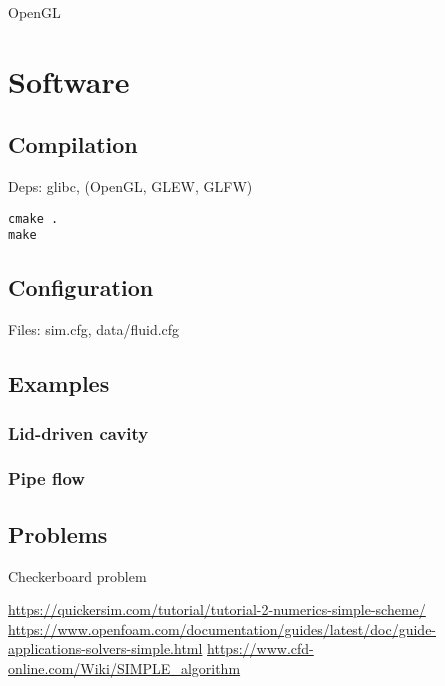 \documentclass[12pt]{article}
\begin{document}
OpenGL

\section{Software}

\subsection{Compilation}

Deps: glibc, (OpenGL, GLEW, GLFW)

\begin{verbatim}
cmake .
make
\end{verbatim}

\subsection{Configuration}

Files: sim.cfg, data/fluid.cfg

\subsection{Examples}

\subsubsection{Lid-driven cavity}

\subsubsection{Pipe flow}

\subsection{Problems}

Checkerboard problem

\begin{thebibliography}{9}

 \url{https://quickersim.com/tutorial/tutorial-2-numerics-simple-scheme/}
 \url{https://www.openfoam.com/documentation/guides/latest/doc/guide-applications-solvers-simple.html}
   \url{https://www.cfd-online.com/Wiki/SIMPLE_algorithm}

\end{thebibliography}
\end{document}
